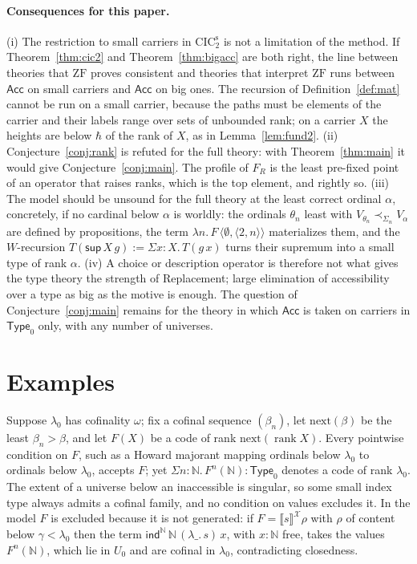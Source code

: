 \documentclass[10pt]{article}
\newcommand{\N}{\mathbb{N}}
\newcommand{\Type}{\mathsf{Type}}
\newcommand{\CIC}{\mathrm{CIC}}
\newcommand{\ZF}{\mathrm{ZF}}
\newcommand{\rk}{\operatorname{rank}}
\newcommand{\sem}[1]{\llbracket #1\rrbracket}
\newcommand{\X}{\mathcal{X}}
\newcommand{\ind}{\mathsf{ind}}
\newcommand{\Acc}{\mathsf{Acc}}
\begin{document}
\paragraph{Consequences for this paper.}
(i) The restriction to small carriers in $\CIC_2^{\mathrm s}$ is not a
limitation of the method. If Theorem~\ref{thm:cic2} and
Theorem~\ref{thm:bigacc} are both right, the line between theories that
$\ZF$ proves consistent and theories that interpret $\ZF$ runs between
$\Acc$ on small carriers and $\Acc$ on big ones. The recursion of
Definition~\ref{def:mat} cannot be run on a small carrier, because the
paths must be elements of the carrier and their labels range over sets
of unbounded rank; on a carrier $X$ the heights are below $\hbar$ of the
rank of $X$, as in Lemma~\ref{lem:fund2}.
(ii) Conjecture~\ref{conj:rank} is refuted for the full theory: with
Theorem~\ref{thm:main} it would give Conjecture~\ref{conj:main}. The
profile of $F_R$ is the least pre-fixed point of an operator that raises
ranks, which is the top element, and rightly so.
(iii) The model should be unsound for the full theory at the least
correct ordinal $\alpha$, concretely, if no cardinal below $\alpha$ is worldly:
the ordinals $\theta_n$ least with
$V_{\theta_n}\prec_{\Sigma_n}V_\alpha$ are defined by propositions, the term
$\lambda n.\,F\,\langle\emptyset,\langle 2,n\rangle\rangle$ materializes them, and
the $W$-recursion $T(\mathsf{sup}\,X\,g):=\Sigma x{:}X.\,T(g\,x)$ turns their
supremum into a small type of rank $\alpha$.
(iv) A choice or description operator is therefore not what gives the
type theory the strength of Replacement; large elimination of
accessibility over a type as big as the motive is enough. The question
of Conjecture~\ref{conj:main} remains for the theory in which $\Acc$ is
taken on carriers in $\Type_0$ only, with any number of universes.

\section{Examples}\label{sec:examples}

\begin{example}\label{ex:climb}
Suppose $\lambda_0$ has cofinality $\omega$; fix a cofinal sequence
$(\beta_n)$, let $\mathrm{next}(\beta)$ be the least $\beta_n>\beta$, and
let $F(X)$ be a code of rank $\mathrm{next}(\rk X)$. Every pointwise
condition on $F$, such as a Howard majorant mapping ordinals below
$\lambda_0$ to ordinals below $\lambda_0$, accepts $F$; yet
$\Sigma n{:}\N.\,F^n(\N):\Type_0$ denotes a code of rank $\lambda_0$. The
extent of a universe below an inaccessible is singular, so some small
index type always admits a cofinal family, and no condition on values
excludes it. In the model $F$ is excluded because it is not generated:
if $F=\sem s^\X\rho$ with $\rho$ of content below $\gamma<\lambda_0$ then
the term $\ind^\N\,\N\,(\lambda\_.\,s)\,x$, with $x{:}\N$ free, takes the
values $F^n(\N)$, which lie in $U_0$ and are cofinal in $\lambda_0$,
contradicting closedness.
\end{example}
\end{document}
